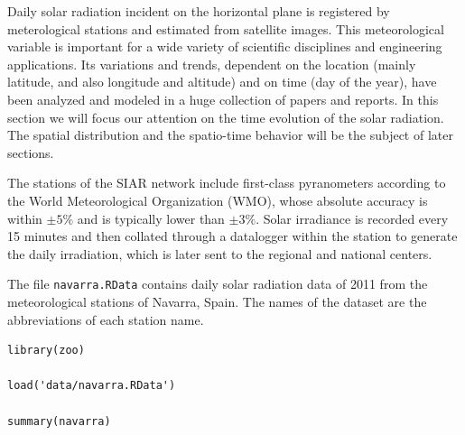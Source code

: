 \documentclass[smallroyalvopaper]{memoir}
\begin{document}

Daily solar radiation incident on the horizontal plane is registered
by meterological stations and estimated from satellite images. This
meteorological variable is important for a wide variety of scientific
disciplines and engineering applications. Its variations and trends,
dependent on the location (mainly latitude, and also longitude and
altitude) and on time (day of the year), have been analyzed and
modeled in a huge collection of papers and reports. In this section
we will focus our attention on the time evolution of the solar
radiation. The spatial distribution and the spatio-time behavior will
be the subject of later sections.

The stations of the SIAR network include first-class pyranometers
according to the World Meteorological Organization (WMO), whose
absolute accuracy is within \(\pm 5\%\) and is typically lower than \(\pm
3\%\). Solar irradiance is recorded every 15 minutes and then
collated through a datalogger within the station to generate the daily
irradiation, which is later sent to the regional and national centers.

The file \texttt{navarra.RData} contains daily solar radiation data of 2011
from the meteorological stations of Navarra, Spain. The names of the
dataset are the abbreviations of each station name.

\lstset{language=r,label= ,caption= ,captionpos=b,numbers=none}
\begin{lstlisting}
library(zoo)

load('data/navarra.RData')

summary(navarra)
\end{lstlisting}
\end{document}
